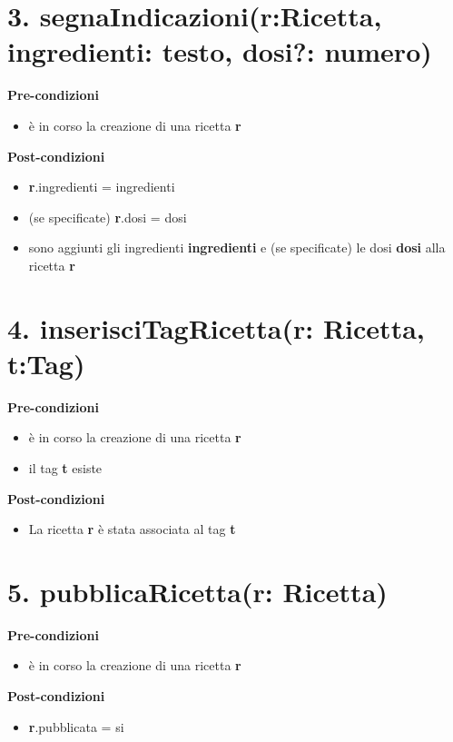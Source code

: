 \documentclass[12pt]{extarticle}
\begin{document}
\section*{3. segnaIndicazioni(r:Ricetta, ingredienti: testo, dosi?: numero)}

\textbf{Pre-condizioni}
\begin{itemize}
  \item è in corso la creazione di una ricetta  \textbf{r}
\end{itemize}
\textbf{Post-condizioni}
\begin{itemize}
    \item \textbf{r}.ingredienti = ingredienti
    \item (se specificate) \textbf{r}.dosi = dosi
    \item sono aggiunti gli ingredienti  \textbf{ingredienti} e (se specificate) le dosi  \textbf{dosi} alla ricetta \textbf{r}
\end{itemize}



\section*{4. inserisciTagRicetta(r: Ricetta, t:Tag)}

\textbf{Pre-condizioni}
\begin{itemize}
  \item è in corso la creazione di una ricetta  \textbf{r}
  \item il tag \textbf{t} esiste
\end{itemize}
\textbf{Post-condizioni}
\begin{itemize}
  \item La ricetta  \textbf{r} è stata associata al tag \textbf{t} 
\end{itemize}

\section*{5. pubblicaRicetta(r: Ricetta)}

\textbf{Pre-condizioni}
\begin{itemize}
  \item è in corso la creazione di una ricetta  \textbf{r}
\end{itemize}
\textbf{Post-condizioni}
\begin{itemize}
  \item \textbf{r}.pubblicata = si
\end{itemize}
\end{document}
